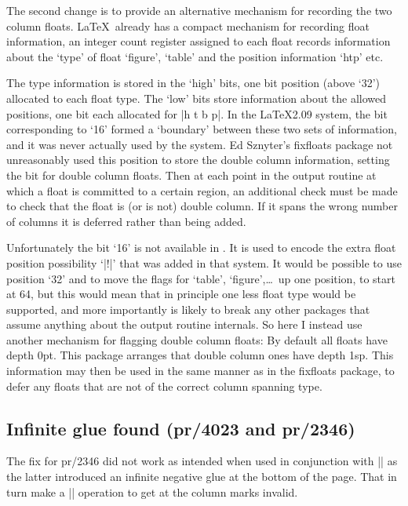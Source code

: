\documentclass{ltxguide}
\newcommand\Lpack[1]{\textsf{#1}}
\begin{document}
The second change is to provide an alternative mechanism for
recording the two column floats. \LaTeX\ already has a compact
mechanism for recording float information, an integer count register
assigned to each float records information about the `type' of float
`figure', `table' and the position information `htp' etc.

The type information is stored in the `high' bits, one bit position
(above `32') allocated to each float type. The `low' bits store
information about the allowed positions, one bit each allocated for
|h t b p|.  In the \LaTeX2.09 system, the bit corresponding to `16'
formed a `boundary' between these two sets of information, and it
was never actually used by the system. Ed Sznyter's
\Lpack{fixfloats} package not unreasonably used this position to
store the double column information, setting the bit for double
column floats. Then at each point in the output routine at which a
float is committed to a certain region, an additional check must be
made to check that the float is (or is not) double column. If it
spans the wrong number of columns it is deferred rather than being
added.

Unfortunately the bit `16' is not available in \LaTeXe. It is used
to encode the extra float position possibility `|!|' that was added
in that system. It would be possible to use position `32' and to
move the flags for `table', `figure',\ldots\ up one position, to
start at 64, but this would mean that in principle one less float
type would be supported, and more importantly is likely to break
any other packages that assume anything about the output routine
internals. So here I instead use another mechanism for flagging
double column floats: By default all floats have depth 0pt.
This package arranges that double column ones have depth 1sp.
This information may then be used in the same manner as in
the \Lpack{fixfloats} package, to defer any floats that are not of
the correct column spanning type.



\subsection{Infinite glue found (pr/4023 and pr/2346)}

The fix for pr/2346 did not work as intended when used in conjunction
with |\enlargethispage| as the latter introduced an infinite negative
glue at the bottom of the page. That in turn make a |\vsplit|
operation to get at the column marks invalid.
\end{document}
